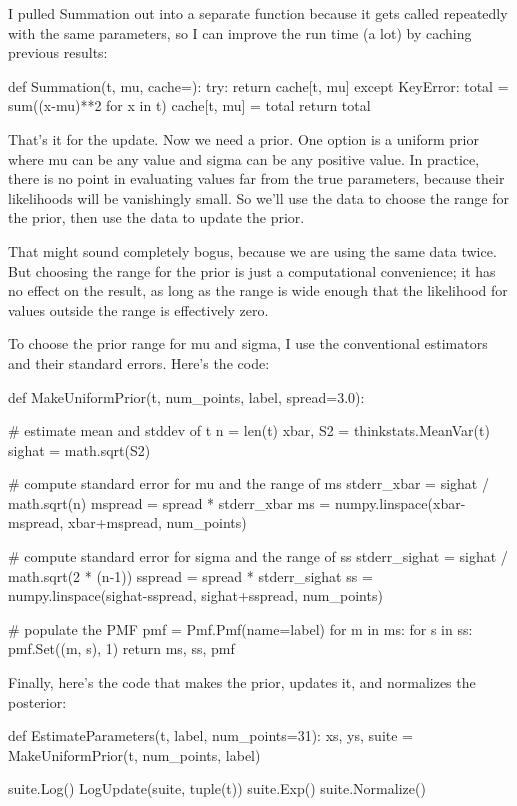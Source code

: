 \documentclass[12pt]{book}
\begin{document}
I pulled Summation out into a separate function because it gets called
repeatedly with the same parameters, so I can improve the run time (a
lot) by caching previous results:


def Summation(t, mu, cache={}):
    try:
        return cache[t, mu]
    except KeyError:
        total = sum((x-mu)**2 for x in t)
        cache[t, mu] = total
        return total

That's it for the update.  Now we need a prior.  One option is a
uniform prior where mu can be any value and sigma can be any positive
value.  In practice, there is no point in evaluating values far from
the true parameters, because their likelihoods will be vanishingly
small.  So we'll use the data to choose the range for the prior, then
use the data to update the prior.

That might sound completely bogus, because we are using the same data
twice.  But choosing the range for the prior is just a computational
convenience; it has no effect on the result, as long as the range is
wide enough that the likelihood for values outside the range is
effectively zero.

To choose the prior range for mu and sigma, I use the conventional
estimators and their standard errors.  Here's the code:


def MakeUniformPrior(t, num_points, label, spread=3.0):
    
    # estimate mean and stddev of t
    n = len(t)
    xbar, S2 = thinkstats.MeanVar(t)
    sighat = math.sqrt(S2)


    # compute standard error for mu and the range of ms
    stderr_xbar = sighat / math.sqrt(n)
    mspread = spread * stderr_xbar
    ms = numpy.linspace(xbar-mspread, xbar+mspread, num_points)


    # compute standard error for sigma and the range of ss
    stderr_sighat = sighat / math.sqrt(2 * (n-1))
    sspread = spread * stderr_sighat
    ss = numpy.linspace(sighat-sspread, sighat+sspread, num_points)


    # populate the PMF
    pmf = Pmf.Pmf(name=label)
    for m in ms:
        for s in ss:
            pmf.Set((m, s), 1)
    return ms, ss, pmf

Finally, here's the code that makes the prior, updates it, and
normalizes the posterior:

def EstimateParameters(t, label, num_points=31):
    xs, ys, suite = MakeUniformPrior(t, num_points, label)

    suite.Log()
    LogUpdate(suite, tuple(t))
    suite.Exp()
    suite.Normalize()
\end{document}
